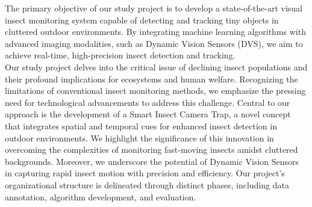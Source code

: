 \documentclass[sigchi,screen]{acmart}
\begin{document}
The primary objective of our study project is to develop a state-of-the-art visual insect monitoring system capable of detecting and tracking tiny objects in cluttered outdoor environments. By integrating machine learning algorithms with advanced imaging modalities, such as Dynamic Vision Sensors (DVS), we aim to achieve real-time, high-precision insect detection and tracking.\\
Our study project delves into the critical issue of declining insect populations and their profound implications for ecosystems and human welfare. Recognizing the limitations of conventional insect monitoring methods, we emphasize the pressing need for technological advancements to address this challenge. Central to our approach is the development of a Smart Insect Camera Trap, a novel concept that integrates spatial and temporal cues for enhanced insect detection in outdoor environments. We highlight the significance of this innovation in overcoming the complexities of monitoring fast-moving insects amidst cluttered backgrounds. Moreover, we underscore the potential of Dynamic Vision Sensors in capturing rapid insect motion with precision and efficiency. Our project's organizational structure is delineated through distinct phases, including data annotation, algorithm development, and evaluation.

\end{document}
